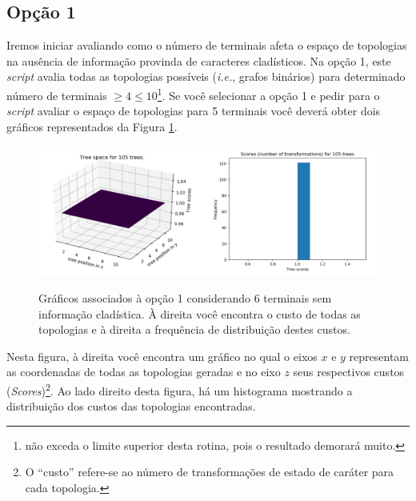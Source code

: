 \begin{refsection}
\subsection{Opção 1}\label{tut3:subs:flat}
	Iremos iniciar avaliando como o número de terminais afeta o espaço de topologias na ausência de informação provinda de caracteres cladísticos. Na opção 1, este \textit{script} avalia todas as topologias possíveis (\textit{i.e.}, grafos binários) para determinado número de terminais $\ge 4 \le 10$\footnote{não exceda o limite superior desta rotina, pois o resultado demorará muito.}. Se você selecionar a opção 1 e pedir para o \textit{script} avaliar o espaço de topologias para 5 terminais você deverá obter dois gráficos representados da Figura \ref{tut3:fig:flat}.
 

  \begin{figure}[H]
  \centering
      {\includegraphics[scale=0.65]{figures/tut3/opcao_1_6_terminals.pdf}}
      {\caption[\textit{\textit{No informative characters} }]{Gráficos associados à opção 1 considerando 6 terminais sem informação cladística. À direita você encontra o custo de todas as topologias e à direita a frequência de distribuição destes custos.}\label{tut3:fig:flat}}
  \end{figure}



	Nesta figura, à direita você encontra um gráfico no qual o eixos $x$ e $y$ representam as coordenadas de todas as topologias geradas e no eixo $z$ seus respectivos custos  (\textit{Scores})\footnote{O ``custo'' refere-se ao número de transformações de estado de caráter para cada topologia.}. Ao lado direito desta figura, há um histograma mostrando a distribuição dos custos das topologias encontradas.\\


\end{refsection}
